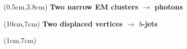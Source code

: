 {
\begin{frame}

\begin{textblock*}{6cm}(0.5cm,3.8cm) %
   \textcolor{HHwhite2}{\textbf{Two narrow EM clusters $\to$ photons}}
\end{textblock*}

\begin{textblock*}{6cm}(10cm,7cm) %
   \textcolor{HHwhite2}{\textbf{Two displaced vertices $\to$ $b$-jets}}
\end{textblock*}

\begin{textblock*}{7cm}(1cm,7cm)
\end{textblock*}


\end{frame}
}

